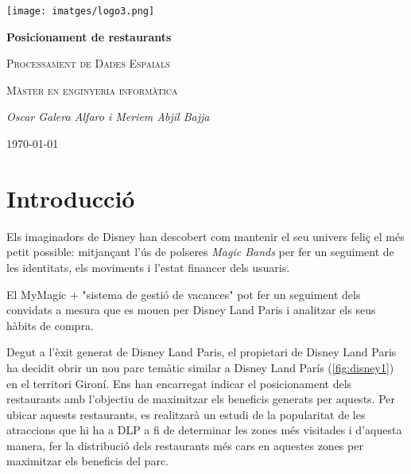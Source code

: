 \documentclass[12pt]{article}
\begin{document}
\begin{titlepage}
		\centering
		\texttt{[image: imatges/logo3.png]}\par\vspace{1cm}
		{\huge\bfseries Posicionament de restaurants\par}
		\vspace{0.3cm}
		{\scshape\Large Processament de Dades Espaials\par}
		\vspace{0.2cm}
		{\scshape\Large Màster en enginyeria informàtica\par}
		\vspace{1.5cm}
		{\Large\itshape Oscar Galera Alfaro i Meriem Abjil Bajja\par}
		\vfill
		{\large \today\par}
\end{titlepage}
\tableofcontents

\clearpage

\listoffigures

\clearpage

\section{Introducció}

Els imaginadors de Disney han descobert com mantenir el seu univers feliç el més petit possible: mitjançant l'ús de polseres \textit{Magic Bands} per fer un seguiment de les identitats, els moviments i l'estat financer dels usuaris.

El MyMagic + "sistema de gestió de vacances" pot fer un seguiment dels convidats a mesura que es mouen per Disney Land Paris i analitzar els seus hàbits de compra.

Degut a l'èxit generat de Disney Land Paris, el propietari de Disney Land Paris ha decidit obrir un nou parc temàtic similar a Disney Land París (\ref{fig:disney1}) en el territori Gironí. Ens han encarregat indicar el posicionament dels restaurants amb l'objectiu de maximitzar els beneficis generats per aquests. Per ubicar aquests restaurants, es realitzarà un estudi de la popularitat de les atraccions que hi ha a DLP a fi de determinar les zones més visitades i d'aquesta manera, fer la distribució dels restaurants més cars en aquestes zones per maximitzar els beneficis del parc.
\end{document}

